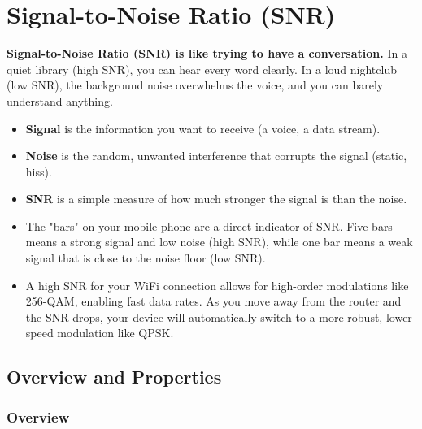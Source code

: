 
\chapter{Signal-to-Noise Ratio (SNR)}
\label{ch:snr}

\begin{nontechnical}
    \textbf{Signal-to-Noise Ratio (SNR) is like trying to have a conversation.} In a quiet library (high SNR), you can hear every word clearly. In a loud nightclub (low SNR), the background noise overwhelms the voice, and you can barely understand anything.

    \begin{itemize}
        \item \textbf{Signal} is the information you want to receive (a voice, a data stream).
        \item \textbf{Noise} is the random, unwanted interference that corrupts the signal (static, hiss).
        \item \textbf{SNR} is a simple measure of how much stronger the signal is than the noise.
    \end{itemize}

    \begin{itemize}
        \item The "bars" on your mobile phone are a direct indicator of SNR. Five bars means a strong signal and low noise (high SNR), while one bar means a weak signal that is close to the noise floor (low SNR).
        \item A high SNR for your WiFi connection allows for high-order modulations like 256-QAM, enabling fast data rates. As you move away from the router and the SNR drops, your device will automatically switch to a more robust, lower-speed modulation like QPSK.
    \end{itemize}
\end{nontechnical}


\section{Overview and Properties}

\subsection{Overview}

